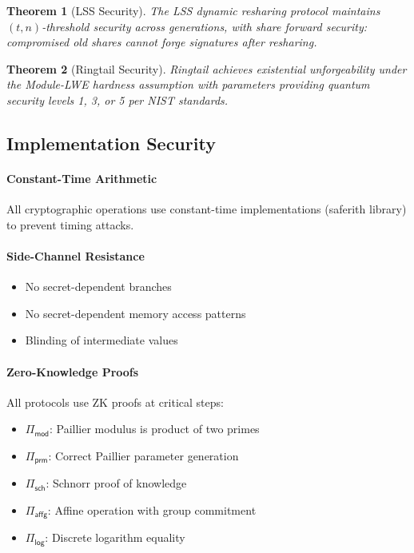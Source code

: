 \documentclass[11pt,twocolumn]{article}
\newtheorem{theorem}{Theorem}
\begin{document}
\begin{theorem}[LSS Security]
The LSS dynamic resharing protocol maintains $(t,n)$-threshold security across generations, with share forward security: compromised old shares cannot forge signatures after resharing.
\end{theorem}

\begin{theorem}[Ringtail Security]
Ringtail achieves existential unforgeability under the Module-LWE hardness assumption with parameters providing quantum security levels 1, 3, or 5 per NIST standards.
\end{theorem}

\subsection{Implementation Security}

\paragraph{Constant-Time Arithmetic} All cryptographic operations use constant-time implementations (saferith library) to prevent timing attacks.

\paragraph{Side-Channel Resistance}
\begin{itemize}
\item No secret-dependent branches
\item No secret-dependent memory access patterns
\item Blinding of intermediate values
\end{itemize}

\paragraph{Zero-Knowledge Proofs} All protocols use ZK proofs at critical steps:
\begin{itemize}
\item $\Pi_{\textsf{mod}}$: Paillier modulus is product of two primes
\item $\Pi_{\textsf{prm}}$: Correct Paillier parameter generation
\item $\Pi_{\textsf{sch}}$: Schnorr proof of knowledge
\item $\Pi_{\textsf{affg}}$: Affine operation with group commitment
\item $\Pi_{\textsf{log}}$: Discrete logarithm equality
\end{itemize}
\end{document}

